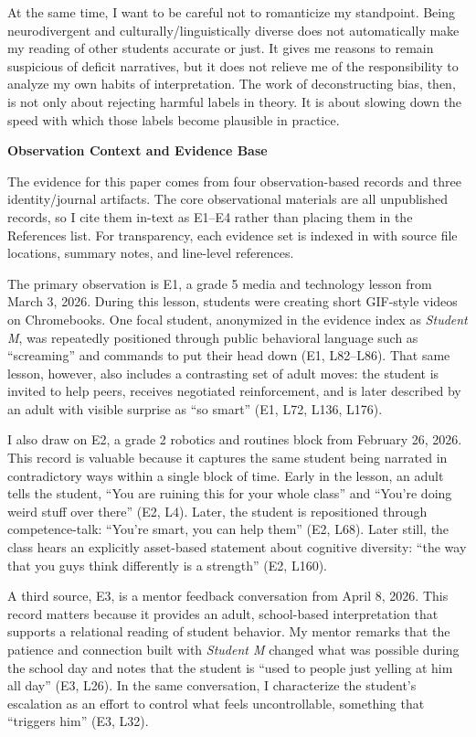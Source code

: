 \documentclass[12pt]{article}
\newcommand{\levelone}[1]{\begin{center}\textbf{#1}\end{center}}
\newcommand{\EvidenceSet}[1]{\textsc{E#1}}
\begin{document}
At the same time, I want to be careful not to romanticize my standpoint. Being neurodivergent and culturally/linguistically diverse does not automatically make my reading of other students accurate or just. It gives me reasons to remain suspicious of deficit narratives, but it does not relieve me of the responsibility to analyze my own habits of interpretation. The work of deconstructing bias, then, is not only about rejecting harmful labels in theory. It is about slowing down the speed with which those labels become plausible in practice.

\levelone{Observation Context and Evidence Base}

The evidence for this paper comes from four observation-based records and three identity/journal artifacts. The core observational materials are all unpublished records, so I cite them in-text as \EvidenceSet{1}--\EvidenceSet{4} rather than placing them in the References list. For transparency, each evidence set is indexed in  with source file locations, summary notes, and line-level references.

The primary observation is \EvidenceSet{1}, a grade 5 media and technology lesson from March 3, 2026. During this lesson, students were creating short GIF-style videos on Chromebooks. One focal student, anonymized in the evidence index as \textit{Student M}, was repeatedly positioned through public behavioral language such as ``screaming'' and commands to put their head down (\EvidenceSet{1}, L82--L86). That same lesson, however, also includes a contrasting set of adult moves: the student is invited to help peers, receives negotiated reinforcement, and is later described by an adult with visible surprise as ``so smart'' (\EvidenceSet{1}, L72, L136, L176).

I also draw on \EvidenceSet{2}, a grade 2 robotics and routines block from February 26, 2026. This record is valuable because it captures the same student being narrated in contradictory ways within a single block of time. Early in the lesson, an adult tells the student, ``You are ruining this for your whole class'' and ``You're doing weird stuff over there'' (\EvidenceSet{2}, L4). Later, the student is repositioned through competence-talk: ``You're smart, you can help them'' (\EvidenceSet{2}, L68). Later still, the class hears an explicitly asset-based statement about cognitive diversity: ``the way that you guys think differently is a strength'' (\EvidenceSet{2}, L160).

A third source, \EvidenceSet{3}, is a mentor feedback conversation from April 8, 2026. This record matters because it provides an adult, school-based interpretation that supports a relational reading of student behavior. My mentor remarks that the patience and connection built with \textit{Student M} changed what was possible during the school day and notes that the student is ``used to people just yelling at him all day'' (\EvidenceSet{3}, L26). In the same conversation, I characterize the student's escalation as an effort to control what feels uncontrollable, something that ``triggers him'' (\EvidenceSet{3}, L32).
\end{document}
